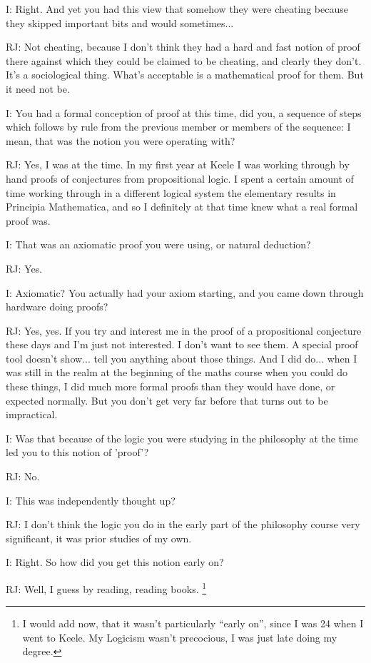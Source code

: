 \documentclass[10pt,titlepage]{book}
\begin{document}
I: Right. And yet you had this view that somehow they were cheating because they skipped important bits and would sometimes...

RJ: Not cheating, because I don't think they had a hard and fast notion of proof there against which they could be claimed to be cheating, and clearly they don't.
It's a sociological thing.
What's acceptable is a mathematical proof for them.
But it need not be.

I: You had a formal conception of proof at this time, did you, a sequence of steps which follows by rule from the previous member or members of the sequence: I mean, that was the notion you were operating with?

RJ: Yes, I was at the time.
In my first year at Keele I was working through by hand proofs of conjectures from propositional logic.
I spent a certain amount of time working through in a different logical system the elementary results in Principia Mathematica, and so I definitely at that time knew what a real formal proof was.

I: That was an axiomatic proof you were using, or natural deduction?

RJ: Yes.

I: Axiomatic?
You actually had your axiom starting, and you came down through hardware doing proofs?

RJ: Yes, yes.
If you try and interest me in the proof of a propositional conjecture these days and I'm just not interested.
I don't want to see them.
A special proof tool doesn't show... tell you anything about those things.
And I did do... when I was still in the realm at the beginning of the maths course when you could do these things, I did much more formal proofs than they would have done, or expected normally.
But you don't get very far before that turns out to be impractical.

I: Was that because of the logic you were studying in the philosophy at the time led you to this notion of 'proof'?

RJ: No.

I: This was independently thought up?

RJ: I don't think the logic you do in the early part of the philosophy course very significant, it was prior studies of my own.

I: Right.
So how did you get this notion early on?

RJ: Well, I guess by reading, reading books.%
\footnote{I would add now, that it wasn't particularly ``early on'', since I was 24 when I went to Keele.
My Logicism wasn't precocious, I was just late doing my degree.
}%
\end{document}
